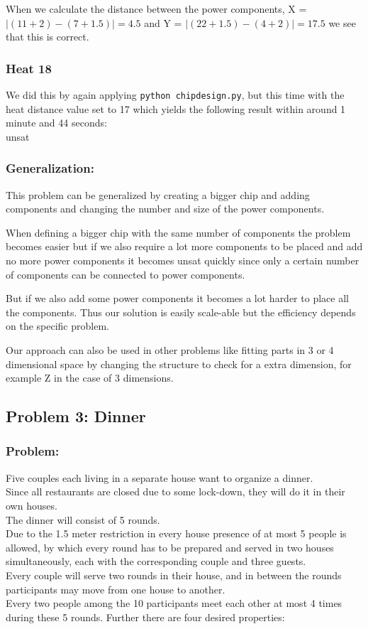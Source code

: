 \documentclass[12pt]{article}
\begin{document}
When we calculate the distance between the power components, X = $ | (11 + 2) - (7 + 1.5) | = 4.5 $ and Y = $ | (22+1.5) - (4+2) | = 17.5 $ we see that this is correct.

\subsubsection*{Heat 18}

We did this by again applying {\tt python chipdesign.py}, but this time with the heat distance value set to 17 which yields the following result within around 1 minute and 44 seconds: \\

unsat

\subsubsection*{Generalization:}

This problem can be generalized by creating a bigger chip and adding components and changing the number and size of the power components.

When defining a bigger chip with the same number of components the problem becomes easier but if we also require a lot more components to be placed and add no more power components it becomes unsat quickly since only a certain number of components can be connected to power components.

But if we also add some power components it becomes a lot harder to place all the components. Thus our solution is easily scale-able but the efficiency depends on the specific problem.

Our approach can also be used in other problems like fitting parts in 3 or 4 dimensional space by changing the structure to check for a extra dimension, for example Z in the case of 3 dimensions.

\subsection*{Problem 3: Dinner}

\subsubsection*{Problem:}
Five couples each living in a separate house want to organize a dinner. \\
Since all restaurants are closed due to some lock-down, they will do it in their own houses. \\
The dinner will consist of 5 rounds. \\
Due to the 1.5 meter restriction in every house presence of at most 5 people is allowed, by which every round has to be prepared and served in two houses simultaneously, each with the corresponding couple and three guests. \\
Every couple will serve two rounds in their house, and in between the rounds participants may move from one house to another. \\
Every two people among the 10 participants meet each other at most 4 times during these 5 rounds. Further there are four desired properties:\\
\end{document}
